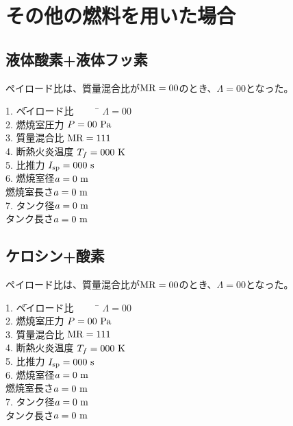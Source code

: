 \documentclass{jsarticle}
\begin{document}
\section{その他の燃料を用いた場合}
\subsection{液体酸素+液体フッ素}
ペイロード比は、質量混合比が$\rm{MR}=00$のとき、$\Lambda = 00$となった。
\begin{tabbing} 
1. \=ペイロード比 ~~~~ \= $\Lambda = 00$\\

2. \>燃焼室圧力 \> $P = 00 ~\rm{Pa}$\\

3. \>質量混合比 \>$\rm{MR}=111$\\

4. \>断熱火炎温度 \>$T_f = 000 ~ \rm{K}$\\

5. \>比推力 \>$I_{\rm{sp}}= 000 ~\rm{s}$\\

6. \>燃焼室径\>$a = 0 ~ \rm{m}$\\

\>燃焼室長さ\>$a = 0 ~ \rm{m}$\\

7. \>タンク径\>$a = 0 ~ \rm{m}$\\

\>タンク長さ\>$a = 0 ~ \rm{m}$\\
\end{tabbing} 


\subsection{ケロシン+酸素}
ペイロード比は、質量混合比が$\rm{MR}=00$のとき、$\Lambda = 00$となった。
\begin{tabbing} 
1. \=ペイロード比 ~~~~ \= $\Lambda = 00$\\

2. \>燃焼室圧力 \> $P = 00 ~\rm{Pa}$\\

3. \>質量混合比 \>$\rm{MR}=111$\\

4. \>断熱火炎温度 \>$T_f = 000 ~ \rm{K}$\\

5. \>比推力 \>$I_{\rm{sp}}= 000 ~\rm{s}$\\

6. \>燃焼室径\>$a = 0 ~ \rm{m}$\\

\>燃焼室長さ\>$a = 0 ~ \rm{m}$\\

7. \>タンク径\>$a = 0 ~ \rm{m}$\\

\>タンク長さ\>$a = 0 ~ \rm{m}$\\
\end{tabbing} 
\end{document}
